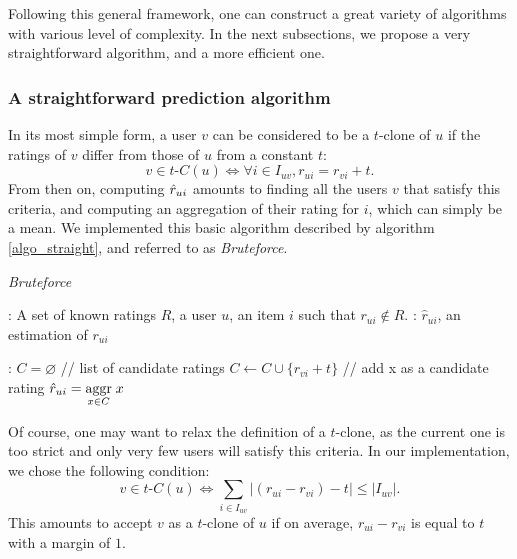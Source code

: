 Following this general framework, one can construct a great variety of
algorithms with various level of complexity. In the next subsections, we
propose a very straightforward algorithm, and a more efficient one.

\subsubsection{A straightforward prediction algorithm}
\label{STRAIGHTFORWARD}

In its most simple form, a user $v$ can be considered to be a $t$-clone of $u$ if
the ratings of $v$ differ from those of $u$ from a constant $t$:
\begin{equation}
v \in t\text{-}C(u) \iff \forall i \in I_{uv}, r_{ui} = r_{vi} + t.
\end{equation}
From then on, computing $\hat{r}_{ui}$ amounts to finding all the users $v$ that
satisfy this criteria, and computing an aggregation of their rating for $i$,
which can simply be a mean. We implemented this basic algorithm described by
algorithm \ref{algo_straight}, and referred to as \textit{Bruteforce}.

 \begin{algorithm}[!ht]
   \caption{\textit{Bruteforce}}
       \label{algo_straight}
       \begin{algorithmic}

      : A set of known ratings $R$, a user $u$, an item
      $i$ such that $r_{ui} \notin R$.
      : $\hat{r}_{ui}$, an estimation of $r_{ui}$

      :
      \STATE $C = \varnothing$ \quad \quad // list of candidate ratings
          \STATE $C \gets C \cup \{r_{vi} + t\}$ \quad // add x as a candidate rating
          \ENDIF
        \ENDFOR
	    \ENDFOR
    \STATE $\hat{r}_{ui} = \underset{x \in C}{\operatorname{aggr}}\; x$
\end{algorithmic}
\end{algorithm}

Of course, one may want to relax the definition of a $t$-clone, as the current
one is too strict and only very few users will satisfy this criteria. In our
implementation, we chose the following condition:
$$v \in t\text{-}C(u) \iff \sum_{i \in I_{uv}} |(r_{ui} - r_{vi}) - t| \leq |I_{uv}|.$$
This amounts to accept $v$ as a $t$-clone of $u$ if on average, $r_{ui} -
r_{vi}$ is equal to $t$ with a margin of $1$.

